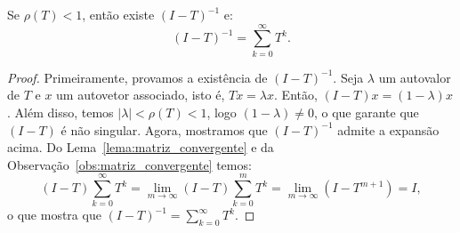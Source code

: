 \begin{lem}\label{lema:inversa}
  Se $\rho(T) < 1$, então existe $(I - T)^{-1}$ e:
  \begin{equation}
    (I - T)^{-1} = \sum_{k=0}^\infty T^k.
  \end{equation}
\end{lem}
\begin{proof}
  Primeiramente, provamos a existência de $(I - T)^{-1}$. Seja $\lambda$ um autovalor de $T$ e $x$ um autovetor associado, isto é, $Tx = \lambda x$. Então, $(I-T)x = (1-\lambda)x$. Além disso, temos $|\lambda| < \rho(T) < 1$, logo $(1 - \lambda) \neq 0$, o que garante que $(I - T)$ é não singular.
  Agora, mostramos que $(I - T)^{-1}$ admite a expansão acima. Do Lema~\ref{lema:matriz_convergente} e da Observação~\ref{obs:matriz_convergente} temos:
  \begin{equation}
   (I - T)\sum_{k=0}^\infty T^k =  \lim_{m\to\infty} (I - T)\sum_{k=0}^m T^k = \lim_{m\to\infty} (I - T^{m+1}) = I,
  \end{equation}
o que mostra que $\displaystyle (I - T)^{-1} = \sum_{k=0}^\infty T^k$.
\end{proof}

